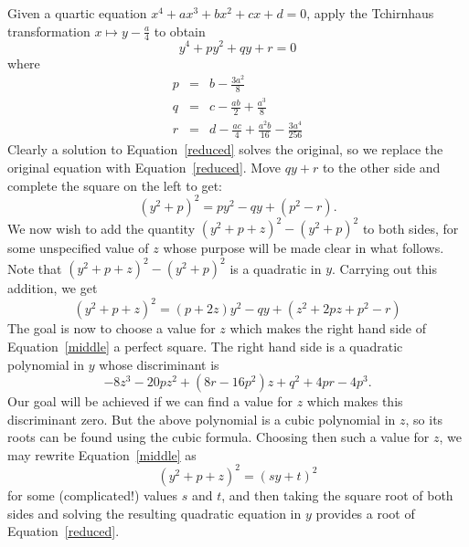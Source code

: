 \documentclass[12pt]{article}
\begin{document}
Given a quartic equation $x^4 + ax^3 + bx^2 + cx + d = 0$, apply the Tchirnhaus transformation $x \mapsto y - \frac{a}{4}$ to obtain
\begin{equation}\label{reduced}
y^4 + py^2 + qy + r = 0
\end{equation}
where
\begin{eqnarray*}
p & = & b - \frac{3a^2}{8}\\
q & = & c - \frac{ab}{2} + \frac{a^3}{8}\\
r & = & d - \frac{ac}{4} + \frac{a^2 b}{16} - \frac{3a^4}{256}
\end{eqnarray*}
Clearly a solution to Equation~\eqref{reduced} solves the original, so we replace the original equation with Equation~\eqref{reduced}. Move $qy+r$ to the other side and complete the square on the left to get:
$$
(y^2+p)^2 = py^2 - qy + (p^2 - r).
$$
We now wish to add the quantity $(y^2+p+z)^2 - (y^2+p)^2$ to both sides, for some unspecified value of $z$ whose purpose will be made clear in what follows. Note that $(y^2+p+z)^2 - (y^2+p)^2$ is a quadratic in $y$. Carrying out this addition, we get
\begin{equation}\label{middle}
(y^2 + p + z)^2 = (p+2z) y^2 - qy + (z^2 + 2pz + p^2 - r)
\end{equation}
The goal is now to choose a value for $z$ which makes the right hand side of Equation~\eqref{middle} a perfect square. The right hand side is a quadratic polynomial in $y$ whose discriminant is
$$
-8 z^3 - 20pz^2 + (8r-16p^2)z + q^2+4pr-4p^3.
$$
Our goal will be achieved if we can find a value for $z$ which makes this discriminant zero. But the above polynomial is a cubic polynomial in $z$, so its roots can be found using the cubic formula. Choosing then such a value for $z$, we may rewrite Equation~\eqref{middle} as
$$
(y^2 + p + z)^2 = (sy + t)^2
$$
for some (complicated!) values $s$ and $t$, and then taking the square root of both sides and solving the resulting quadratic equation in $y$ provides a root of Equation~\eqref{reduced}.
\end{document}
